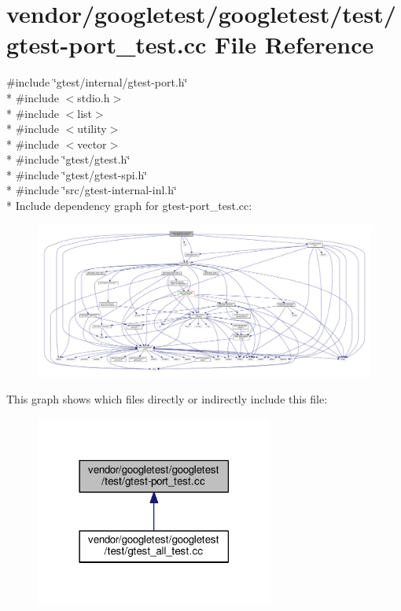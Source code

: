\hypertarget{gtest-port__test_8cc}{}\section{vendor/googletest/googletest/test/gtest-\/port\+\_\+test.cc File Reference}
\label{gtest-port__test_8cc}
{\ttfamily \#include \char`\"{}gtest/internal/gtest-\/port.\+h\char`\"{}}\\*
{\ttfamily \#include $<$stdio.\+h$>$}\\*
{\ttfamily \#include $<$list$>$}\\*
{\ttfamily \#include $<$utility$>$}\\*
{\ttfamily \#include $<$vector$>$}\\*
{\ttfamily \#include \char`\"{}gtest/gtest.\+h\char`\"{}}\\*
{\ttfamily \#include \char`\"{}gtest/gtest-\/spi.\+h\char`\"{}}\\*
{\ttfamily \#include \char`\"{}src/gtest-\/internal-\/inl.\+h\char`\"{}}\\*
Include dependency graph for gtest-\/port\+\_\+test.cc\+:
\nopagebreak
\begin{figure}[H]
\begin{center}
\leavevmode
\includegraphics[width=350pt]{gtest-port__test_8cc__incl}
\end{center}
\end{figure}
This graph shows which files directly or indirectly include this file\+:
\nopagebreak
\begin{figure}[H]
\begin{center}
\leavevmode
\includegraphics[width=222pt]{gtest-port__test_8cc__dep__incl}
\end{center}
\end{figure}
